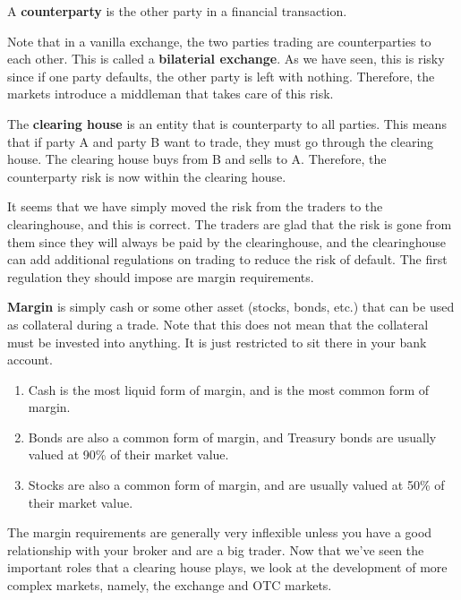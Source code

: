 \documentclass{article}
\begin{document}
    \begin{definition}[Counterparty]
      A \textbf{counterparty} is the other party in a financial transaction. 
    \end{definition}

    Note that in a vanilla exchange, the two parties trading are counterparties to each other. This is called a \textbf{bilaterial exchange}. As we have seen, this is risky since if one party defaults, the other party is left with nothing. Therefore, the markets introduce a middleman that takes care of this risk. 

    \begin{definition}
      The \textbf{clearing house} is an entity that is counterparty to all parties. This means that if party A and party B want to trade, they must go through the clearing house. The clearing house buys from B and sells to A. Therefore, the counterparty risk is now within the clearing house.
    \end{definition}

    It seems that we have simply moved the risk from the traders to the clearinghouse, and this is correct. The traders are glad that the risk is gone from them since they will always be paid by the clearinghouse, and the clearinghouse can add additional regulations on trading to reduce the risk of default. The first regulation they should impose are margin requirements. 

    \begin{definition}[Margin]
      \textbf{Margin} is simply cash or some other asset (stocks, bonds, etc.) that can be used as collateral during a trade. Note that this does not mean that the collateral must be invested into anything. It is just restricted to sit there in your bank account. 
      \begin{enumerate}
        \item Cash is the most liquid form of margin, and is the most common form of margin. 
        \item Bonds are also a common form of margin, and Treasury bonds are usually valued at 90\% of their market value.
        \item Stocks are also a common form of margin, and are usually valued at 50\% of their market value. 
      \end{enumerate}
    \end{definition}

    The margin requirements are generally very inflexible unless you have a good relationship with your broker and are a big trader. Now that we've seen the important roles that a clearing house plays, we look at the development of more complex markets, namely, the exchange and OTC markets. 
\end{document}
